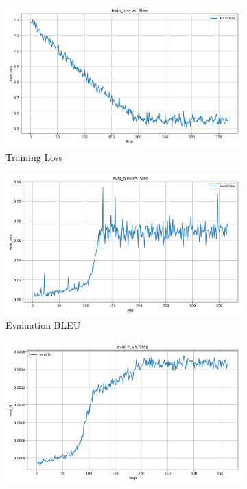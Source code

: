 \documentclass[12pt]{article}
\begin{document}
\begin{figure}[!ht]
	\centering
	\begin{subfigure}[b]{0.32\textwidth}
		\includegraphics[width=\linewidth]{Transformer_train_loss.png}
		\caption{Training Loss}
		\label{fig:train_loss}
	\end{subfigure}
	\hfill
	\begin{subfigure}[b]{0.32\textwidth}
		\includegraphics[width=\linewidth]{Transformer_eval_bleu.png}
		\caption{Evaluation BLEU}
		\label{fig:eval_bleu}
	\end{subfigure}
	\hfill
	\begin{subfigure}[b]{0.32\textwidth}
		\includegraphics[width=\linewidth]{Transformer_eval_f1.png}

\end{subfigure}
\end{figure}
\end{document}
